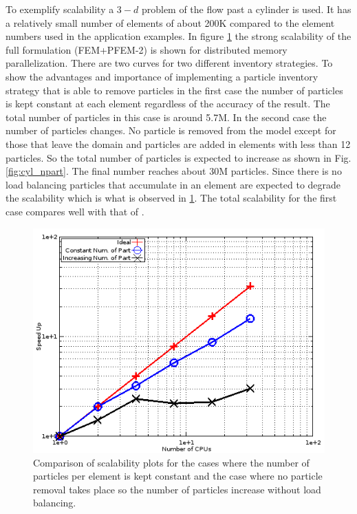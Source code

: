 To exemplify scalability a $3-d$ problem of the flow past a cylinder is used. It has a relatively small number of elements of about 200K compared to the element numbers used in the application examples. 
In figure \ref{fig:scalab} the strong scalability of the full formulation (FEM+PFEM-2) is shown for distributed memory parallelization. There are two curves for two different inventory strategies. To show the advantages and importance of implementing a particle inventory strategy that is able to remove particles in the first case the number of particles is kept constant at each element regardless of the accuracy of the result. The total number of particles in this case is around 5.7M. In the second case the number of particles changes. No particle is removed from the model except for those that leave the domain and particles are added in elements with less than 12 particles. So the total number of particles is expected to increase as shown in Fig. \ref{fig:cyl_npart}. The final number reaches about 30M particles. Since there is no load balancing particles that accumulate in an element are expected to degrade the scalability which is what is observed in \ref{fig:scalab}. The total scalability for the first case compares well with that of \cite{gimenez:parallel}.
%
\begin{figure}[htp] 
\centering 
\includegraphics[scale=.6]{./imgs/scalability1.png}
\caption{Comparison of scalability plots for the cases where the number of particles per element is kept constant and the case where no particle removal takes place so the number of particles increase without load balancing.}
\label{fig:scalab}
\end{figure}
